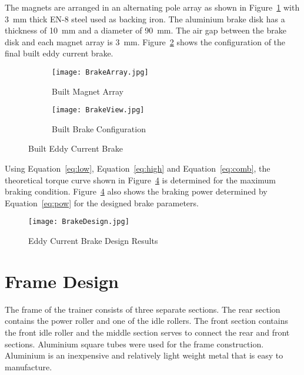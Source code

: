 \vspace*{-0.5cm}

The magnets are arranged in an alternating pole array as shown in Figure~\ref{fig:magarr} with \SI{3}{\milli\meter} thick EN-8 steel used as backing iron. The aluminium brake disk has a thickness of \SI{10}{\milli\meter} and a diameter of \SI{90}{\milli\meter}. The air gap between the brake disk and each magnet array is \SI{3}{\milli\meter}. Figure~\ref{fig:brakefin} shows the configuration of the final built eddy current brake.

\begin{figure}[H]
	\centering
	\begin{subfigure}{.4\textwidth}
		\centering
		\texttt{[image: BrakeArray.jpg]}
		\caption{Built Magnet Array}
		\label{fig:magarr}
	\end{subfigure}%
	\hfill
	\begin{subfigure}{.4\textwidth}
		\centering
		\texttt{[image: BrakeView.jpg]}
		\caption{Built Brake Configuration}
		\label{fig:brakefin}
	\end{subfigure}
	\caption{Built Eddy Current Brake}
	\label{fig:magets}
\end{figure}

\vspace*{-0.5cm}

Using Equation~\ref{eq:low}, Equation~\ref{eq:high} and Equation~\ref{eq:comb}, the theoretical torque curve shown in Figure~\ref{fig:BrakeDesign} is determined for the maximum braking condition. Figure~\ref{fig:BrakeDesign} also shows the braking power determined by Equation~\ref{eq:pow} for the designed brake parameters.

\begin{figure}[H]
	\centering
	\texttt{[image: BrakeDesign.jpg]}
	\caption{Eddy Current Brake Design Results}
	\label{fig:BrakeDesign}
\end{figure}

\vspace*{-0.9cm}

\section{Frame Design}

The frame of the trainer consists of three separate sections. The rear section contains the power roller and one of the idle rollers. The front section contains the front idle roller and the middle section serves to connect the rear and front sections. Aluminium square tubes were used for the frame construction. Aluminium is an inexpensive and relatively light weight metal that is easy to manufacture.


